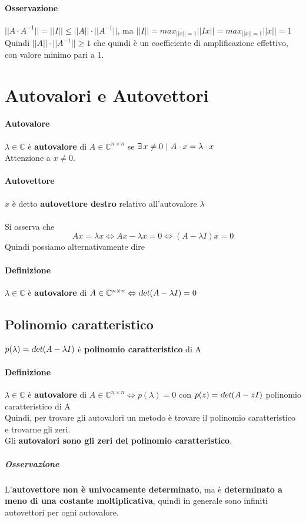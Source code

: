 \documentclass[10pt]{book}
\begin{document}
\paragraph{Osservazione} $||A\cdot A^{-1}|| = ||I|| \leq ||A||\cdot||A^{-1}||$, ma $||I|| = max_{||x|| = 1} ||Ix|| = max_{||x|| = 1} ||x|| = 1$\\
Quindi $||A||\cdot||A^{-1}|| \geq 1$ che quindi è un coefficiente di amplificazione effettivo, con valore minimo pari a 1.
\pagebreak
\section{Autovalori e Autovettori}
\paragraph{Autovalore}  $\lambda \in \mathbb{C}$ è \textbf{autovalore} di $A \in \mathbb{C}^{n \times n}$ se $\exists\, x \neq 0 \:\:\vline\:\:A\cdot x = \lambda\cdot x$\\
Attenzione a $x \neq 0$.
\paragraph{Autovettore} $x$ è detto \textbf{autovettore destro} relativo all'autovalore $\lambda$\\\\
Si osserva che 
$$Ax = \lambda x \Leftrightarrow Ax - \lambda x = 0 \Leftrightarrow (A - \lambda I)x = 0$$
Quindi possiamo alternativamente dire
\paragraph{Definizione} $\lambda \in \mathbb{C}$ è \textbf{autovalore} di $A \in \mathbb{C}^{n \times n} \Leftrightarrow \textsl{det}(A - \lambda I) = 0$
\subsection{Polinomio caratteristico}
$p(\lambda) = \textsl{det}(A - \lambda I)$ è \textbf{polinomio caratteristico} di A
\paragraph{Definizione} $\lambda \in \mathbb{C}$ è \textbf{autovalore} di $A \in \mathbb{C}^{n \times n} \Leftrightarrow p(\lambda) = 0$ con $p(z) = \textsl{det}(A - zI)$ polinomio caratteristico di A\\
Quindi, per trovare gli autovalori un metodo è trovare il polinomio caratteristico e trovarne gli zeri.\\Gli \textbf{autovalori sono gli zeri del polinomio caratteristico}.
\subparagraph{Osservazione} L'\textbf{autovettore non è univocamente determinato}, ma è \textbf{determinato a meno di una costante moltiplicativa}, quindi in generale sono infiniti autovettori per ogni autovalore.
\end{document}

